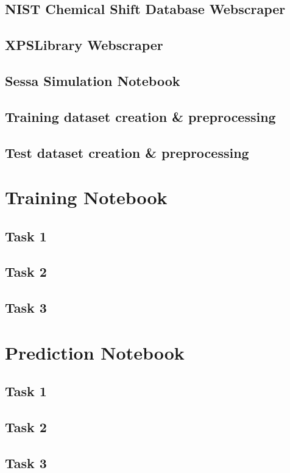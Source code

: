 \subsection{NIST Chemical Shift Database Webscraper}
\label{NIST_WebScraper}


\subsection{XPSLibrary Webscraper}
\label{xpslibrary_webscraper}


\subsection{Sessa Simulation Notebook}
\label{xpslibrary_webscraper}


\subsection{Training dataset creation \& preprocessing}
\label{train_data_generation}


\subsection{Test dataset creation \& preprocessing}
\label{train_data_generation}


\section{Training Notebook}
\subsection{Task 1}

\subsection{Task 2}

\subsection{Task 3}



\section{Prediction Notebook}
\subsection{Task 1}

\subsection{Task 2}

\subsection{Task 3}

